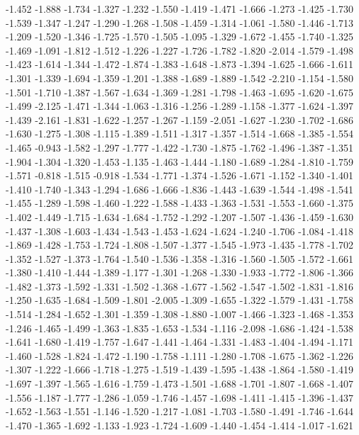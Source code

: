 \documentclass[9pt]{article}
\theoremstyle{plain}
\theoremstyle{definition}
\theoremstyle{remark}
\numberwithin{equation}{section}
\begin{document}
-1.452
-1.888
-1.734
-1.327
-1.232
-1.550
-1.419
-1.471
-1.666
-1.273
-1.425
-1.730
-1.539
-1.347
-1.247
-1.290
-1.268
-1.508
-1.459
-1.314
-1.061
-1.580
-1.446
-1.713
-1.209
-1.520
-1.346
-1.725
-1.570
-1.505
-1.095
-1.329
-1.672
-1.455
-1.740
-1.325
-1.469
-1.091
-1.812
-1.512
-1.226
-1.227
-1.726
-1.782
-1.820
-2.014
-1.579
-1.498
-1.423
-1.614
-1.344
-1.472
-1.874
-1.383
-1.648
-1.873
-1.394
-1.625
-1.666
-1.611
-1.301
-1.339
-1.694
-1.359
-1.201
-1.388
-1.689
-1.889
-1.542
-2.210
-1.154
-1.580
-1.501
-1.710
-1.387
-1.567
-1.634
-1.369
-1.281
-1.798
-1.463
-1.695
-1.620
-1.675
-1.499
-2.125
-1.471
-1.344
-1.063
-1.316
-1.256
-1.289
-1.158
-1.377
-1.624
-1.397
-1.439
-2.161
-1.831
-1.622
-1.257
-1.267
-1.159
-2.051
-1.627
-1.230
-1.702
-1.686
-1.630
-1.275
-1.308
-1.115
-1.389
-1.511
-1.317
-1.357
-1.514
-1.668
-1.385
-1.554
-1.465
-0.943
-1.582
-1.297
-1.777
-1.422
-1.730
-1.875
-1.762
-1.496
-1.387
-1.351
-1.904
-1.304
-1.320
-1.453
-1.135
-1.463
-1.444
-1.180
-1.689
-1.284
-1.810
-1.759
-1.571
-0.818
-1.515
-0.918
-1.534
-1.771
-1.374
-1.526
-1.671
-1.152
-1.340
-1.401
-1.410
-1.740
-1.343
-1.294
-1.686
-1.666
-1.836
-1.443
-1.639
-1.544
-1.498
-1.541
-1.455
-1.289
-1.598
-1.460
-1.222
-1.588
-1.433
-1.363
-1.531
-1.553
-1.660
-1.375
-1.402
-1.449
-1.715
-1.634
-1.684
-1.752
-1.292
-1.207
-1.507
-1.436
-1.459
-1.630
-1.437
-1.308
-1.603
-1.434
-1.543
-1.453
-1.624
-1.624
-1.240
-1.706
-1.084
-1.418
-1.869
-1.428
-1.753
-1.724
-1.808
-1.507
-1.377
-1.545
-1.973
-1.435
-1.778
-1.702
-1.352
-1.527
-1.373
-1.764
-1.540
-1.536
-1.358
-1.316
-1.560
-1.505
-1.572
-1.661
-1.380
-1.410
-1.444
-1.389
-1.177
-1.301
-1.268
-1.330
-1.933
-1.772
-1.806
-1.366
-1.482
-1.373
-1.592
-1.331
-1.502
-1.368
-1.677
-1.562
-1.547
-1.502
-1.831
-1.816
-1.250
-1.635
-1.684
-1.509
-1.801
-2.005
-1.309
-1.655
-1.322
-1.579
-1.431
-1.758
-1.514
-1.284
-1.652
-1.301
-1.359
-1.308
-1.880
-1.007
-1.466
-1.323
-1.468
-1.353
-1.246
-1.465
-1.499
-1.363
-1.835
-1.653
-1.534
-1.116
-2.098
-1.686
-1.424
-1.538
-1.641
-1.680
-1.419
-1.757
-1.647
-1.441
-1.464
-1.331
-1.483
-1.404
-1.494
-1.171
-1.460
-1.528
-1.824
-1.472
-1.190
-1.758
-1.111
-1.280
-1.708
-1.675
-1.362
-1.226
-1.307
-1.222
-1.666
-1.718
-1.275
-1.519
-1.439
-1.595
-1.438
-1.864
-1.580
-1.419
-1.697
-1.397
-1.565
-1.616
-1.759
-1.473
-1.501
-1.688
-1.701
-1.807
-1.668
-1.407
-1.556
-1.187
-1.777
-1.286
-1.059
-1.746
-1.457
-1.698
-1.411
-1.415
-1.396
-1.437
-1.652
-1.563
-1.551
-1.146
-1.520
-1.217
-1.081
-1.703
-1.580
-1.491
-1.746
-1.644
-1.470
-1.365
-1.692
-1.133
-1.923
-1.724
-1.609
-1.440
-1.454
-1.414
-1.017
-1.621
\end{document}
